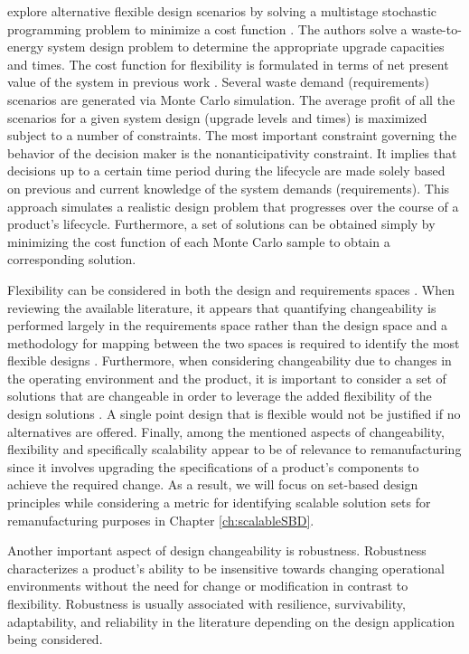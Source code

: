 \citeauthor{Cardin2017} explore alternative flexible design scenarios by solving a multistage stochastic programming problem to minimize a cost function \cite{Cardin2017}. The authors solve a waste-to-energy system design problem to determine the appropriate upgrade capacities and times. The cost function for flexibility is formulated in terms of net present value of the system in previous work \cite{Cardin2016}. Several waste demand (requirements) scenarios are generated via Monte Carlo simulation. The average profit of all the scenarios for a given system design (upgrade levels and times) is maximized subject to a number of constraints. The most important constraint governing the behavior of the decision maker is the nonanticipativity constraint. It implies that decisions up to a certain time period during the lifecycle are made solely based on previous and current knowledge of the system demands (requirements). This approach simulates a realistic design problem that progresses over the course of a product's lifecycle. Furthermore, a set of solutions can be obtained simply by minimizing the cost function of each Monte Carlo sample to obtain a corresponding solution.

Flexibility can be considered in both the design and requirements spaces \cite{Ferguson2008}. When reviewing the available literature, it appears that quantifying changeability is performed largely in the requirements space rather than the design space and a methodology for mapping between the two spaces is required to identify the most flexible designs \cite{Tackett2014,Olewnik2004,Liu2008,Yannou2003}. Furthermore, when considering changeability due to changes in the operating environment and the product, it is important to consider a set of solutions that are changeable in order to leverage the added flexibility of the design solutions \cite{Olewnik2004,Liu2008,Suh2007}. A single point design that is flexible would not be justified if no alternatives are offered. Finally, among the mentioned aspects of changeability, flexibility and specifically scalability appear to be of relevance to remanufacturing since it involves upgrading the specifications of a product's components to achieve the required change. As a result, we will focus on set-based design principles while considering a metric for identifying scalable solution sets for remanufacturing purposes in Chapter \ref{ch:scalableSBD}.

Another important aspect of design changeability is robustness. Robustness characterizes a product's ability to be insensitive towards changing operational environments without the need for change or modification in contrast to flexibility. Robustness is usually associated with resilience, survivability, adaptability, and reliability in the literature depending on the design application being considered. 

